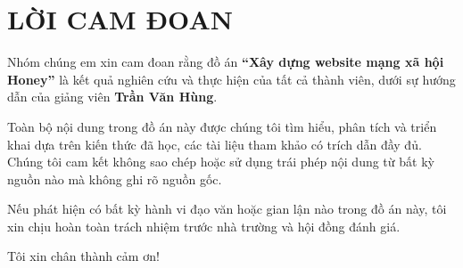 
\newpage

\section{\textbf{LỜI CAM ĐOAN}
}

Nhóm chúng em xin cam đoan rằng đồ án \textbf{“Xây dựng website mạng xã hội Honey”} là kết quả nghiên cứu và thực hiện của tất cả thành viên, dưới sự hướng dẫn của giảng viên \textbf{Trần Văn Hùng}.

Toàn bộ nội dung trong đồ án này được chúng tôi tìm hiểu, phân tích và triển khai dựa trên kiến thức đã học, các tài liệu tham khảo có trích dẫn đầy đủ. Chúng tôi cam kết không sao chép hoặc sử dụng trái phép nội dung từ bất kỳ nguồn nào mà không ghi rõ nguồn gốc.

Nếu phát hiện có bất kỳ hành vi đạo văn hoặc gian lận nào trong đồ án này, tôi xin chịu hoàn toàn trách nhiệm trước nhà trường và hội đồng đánh giá.

Tôi xin chân thành cảm ơn!

 
